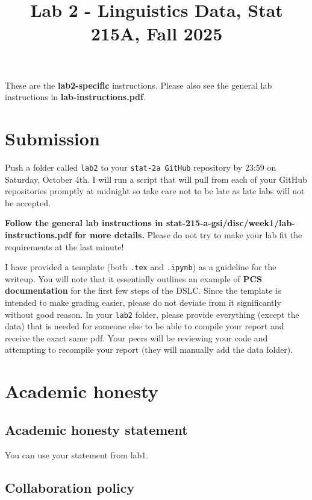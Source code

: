 \documentclass[letterpaper,12pt]{article}
\title{Lab 2 - Linguistics Data, Stat 215A, Fall 2025\vspace{-2em}}
\begin{document}
\maketitle

These are the \textbf{lab2-specific} instructions. Please also see the general lab instructions in \textbf{lab-instructions.pdf}.

\tableofcontents

\section{Submission}
Push a folder called \texttt{lab2} to your \texttt{stat-2a GitHub} repository by 23:59 on Saturday, October 4th. I will run a script that will pull from each of your GitHub repositories promptly at midnight so take care not to be late as late labs will not be accepted.

\textbf{Follow the general lab instructions in stat-215-a-gsi/disc/week1/lab-instructions.pdf for more details.} Please do not try to make your lab fit the requirements at the last minute!

I have provided a template (both \texttt{.tex} and \texttt{.ipynb}) as a guideline for the writeup. You will note that it essentially outlines an example of \textbf{PCS documentation} for the first few steps of the DSLC. Since the template is intended to make grading easier, please do not deviate from it significantly without good reason. In your \texttt{lab2} folder, please provide everything (except the data) that is needed for someone else to be able to compile your report and receive the exact same pdf. Your peers will be reviewing your code and attempting to recompile your report (they will manually add the data folder).

\section{Academic honesty}

\subsection{Academic honesty statement}

You can use your statement from lab1.

\subsection{Collaboration policy}
\end{document}
